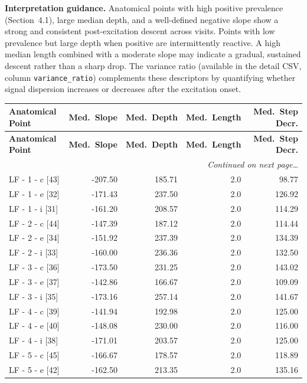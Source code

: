 \documentclass[a4paper,11pt]{article}
\begin{document}
\medskip
\noindent\textbf{Interpretation guidance.}
Anatomical points with high positive prevalence (Section~4.1), large median depth, and a
well-defined negative slope show a strong and consistent post-excitation descent across
visits.
Points with low prevalence but large depth when positive are intermittently reactive.
A high median length combined with a moderate slope may indicate a gradual, sustained
descent rather than a sharp drop.
The variance ratio (available in the detail CSV, column \texttt{variance\_ratio}) complements
these descriptors by quantifying whether signal dispersion increases or decreases after the
excitation onset.

\begin{small}
\begin{longtable}{p{4.5cm}rrrr}
\toprule
\textbf{Anatomical Point} &
\textbf{Med.\ Slope} &
\textbf{Med.\ Depth} &
\textbf{Med.\ Length} &
\textbf{Med.\ Step Decr.} \\
\midrule
\endfirsthead
\toprule
\textbf{Anatomical Point} &
\textbf{Med.\ Slope} &
\textbf{Med.\ Depth} &
\textbf{Med.\ Length} &
\textbf{Med.\ Step Decr.} \\
\midrule
\endhead
\midrule
\multicolumn{5}{r}{\small\emph{Continued on next page\ldots}} \\
\endfoot
\bottomrule
\endlastfoot
LF - 1 - c [43] & -207.50 & 185.71 & 2.0 & 98.77 \\
LF - 1 - e [32] & -171.43 & 237.50 & 2.0 & 126.92 \\
LF - 1 - i [31] & -161.20 & 208.57 & 2.0 & 114.29 \\
LF - 2 - c [44] & -147.39 & 187.12 & 2.0 & 114.44 \\
LF - 2 - e [34] & -151.92 & 237.39 & 2.0 & 134.39 \\
LF - 2 - i [33] & -160.00 & 236.36 & 2.0 & 132.50 \\
LF - 3 - c [36] & -173.50 & 231.25 & 2.0 & 143.02 \\
LF - 3 - e [37] & -142.86 & 166.67 & 2.0 & 109.09 \\
LF - 3 - i [35] & -173.16 & 257.14 & 2.0 & 141.67 \\
LF - 4 - c [39] & -141.94 & 192.98 & 2.0 & 125.00 \\
LF - 4 - e [40] & -148.08 & 230.00 & 2.0 & 116.00 \\
LF - 4 - i [38] & -171.01 & 203.57 & 2.0 & 125.00 \\
LF - 5 - c [45] & -166.67 & 178.57 & 2.0 & 118.89 \\
LF - 5 - e [42] & -162.50 & 213.35 & 2.0 & 135.16 \\

\end{longtable}
\end{small}
\end{document}
